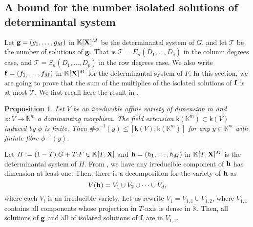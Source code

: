 \documentclass[11pt]{article}
\numberwithin{Property}{section}
\numberwithin{Theorem}{section}
\newtheorem{Proposition}{Proposition}%
\numberwithin{Proposition}{section}
\numberwithin{Lemma}{section}
\numberwithin{Corollary}{section}
\numberwithin{Definition}{section}
\numberwithin{Remark}{section}
\numberwithin{Conjecture}{section}
\numberwithin{Problem}{section}
\numberwithin{Claim}{section}
\theoremstyle{definition}
\numberwithin{Example}{section}
\renewcommand{\leq}{\leqslant}
\def\bar{\overline}
\newcommand{\field}{\mathbb{K}} %
\newcommand{\mat}[1]{\mathbf{\MakeUppercase{#1}}} %
\begin{document}
\subsection{A bound for the number isolated solutions of determinantal system}
\label{subsec:bounddegree}
Let ${\bf g} = (g_1, \ldots, g_M)$ in $\field[\mat{X}]^M$ be the determinantal system of $G$, and let $\mathcal{T}$ be the number of solutions of ${\bf g}$. That is $\mathcal{T} = E_{n}(D_1, \ldots, D_q)$ in the column degrees case, and $\mathcal{T} = S_{n}(D_1, \ldots, D_p)$ in the row degrees case. We also write ${\bf f} = (f_1, \ldots, f_M)$ in $\field[\mat{X}]^M$ for the determinantal system of $F$. In this section, we are going to prove that the sum of the multiplies of the isolated solutions of ${\bf f}$ is at most $\mathcal{T}$. We first recall here the result in \cite[Proposition~1]{Hen83}. 
\begin{Proposition}\label{hen} Let $V$ be an irreducible affine variety of dimension $m$ and $\phi: V \to \field^m$ a dominanting morphism. The field extension $\mathsf{k}(\field^m) \subset \mathsf{k}(V)$ induced by $\phi$ is finite. Then $\#\phi^{-1}(y) \leq [ \mathsf{k}(V) : \mathsf{k}(\field^m)]$ for any $y \in \field^m$ with fininte fibre $\phi^{-1}(y)$.
\end{Proposition}

Let $H := (1-T).G + T.F \in \field[T, \mat{X}]$ and ${\bf h} = (h_1, \ldots, h_M)$ in $\field[T, \mat{X}]^M$ is the determinantal system of $H$. From \cite[Section~6]{Eagon188}, we have any irreducible component of ${\bf h}$ has dimension at least one. Then, there is a decomposition for the variety of ${\bf h}$ as 
\[
V({\bf h}) = V_1 \cup V_2 \cup \cdots \cup V_d, \] where each $V_i$
is an irreducible variety. Let us rewrite $V_1 = V_{1,1} \cup V_{1,2}$, where $V_{1,1}$ contains all components whose projection in $T$-axis is dense in $\bar{\field}$. Then, all solutions of ${\bf g}$ and all of isolated solutions of ${\bf f}$ are in $V_{1,1}$. 
\end{document}
